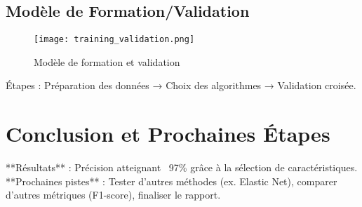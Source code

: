 \documentclass{article}
\begin{document}
\subsection{Modèle de Formation/Validation}
\begin{figure}[h]
    \centering
    \texttt{[image: training\_validation.png]}
    \caption{Modèle de formation et validation}
    \label{fig:training_validation}
\end{figure}
Étapes : Préparation des données → Choix des algorithmes → Validation croisée.

\section{Conclusion et Prochaines Étapes}
**Résultats** : Précision atteignant ~97\% grâce à la sélection de caractéristiques.  
**Prochaines pistes** : Tester d'autres méthodes (ex. Elastic Net), comparer d'autres métriques (F1-score), finaliser le rapport.
\end{document}
